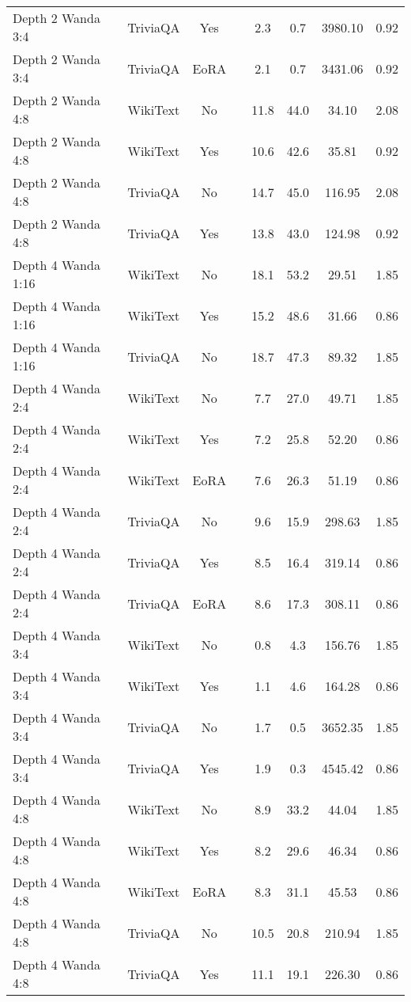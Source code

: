 \begin{longtable}{lcclcccc}
Depth 2 Wanda 3:4 & TriviaQA & Yes & & 2.3 & 0.7 & 3980.10 & 0.92 \\
Depth 2 Wanda 3:4 & TriviaQA & EoRA & & 2.1 & 0.7 & 3431.06 & 0.92 \\
Depth 2 Wanda 4:8 & WikiText & No & & 11.8 & 44.0 & 34.10 & 2.08 \\
Depth 2 Wanda 4:8 & WikiText & Yes & & 10.6 & 42.6 & 35.81 & 0.92 \\
Depth 2 Wanda 4:8 & TriviaQA & No & & 14.7 & 45.0 & 116.95 & 2.08 \\
Depth 2 Wanda 4:8 & TriviaQA & Yes & & 13.8 & 43.0 & 124.98 & 0.92 \\
Depth 4 Wanda 1:16 & WikiText & No & & 18.1 & 53.2 & 29.51 & 1.85 \\
Depth 4 Wanda 1:16 & WikiText & Yes & & 15.2 & 48.6 & 31.66 & 0.86 \\
Depth 4 Wanda 1:16 & TriviaQA & No & & 18.7 & 47.3 & 89.32 & 1.85 \\
Depth 4 Wanda 2:4 & WikiText & No & & 7.7 & 27.0 & 49.71 & 1.85 \\
Depth 4 Wanda 2:4 & WikiText & Yes & & 7.2 & 25.8 & 52.20 & 0.86 \\
Depth 4 Wanda 2:4 & WikiText & EoRA & & 7.6 & 26.3 & 51.19 & 0.86 \\
Depth 4 Wanda 2:4 & TriviaQA & No & & 9.6 & 15.9 & 298.63 & 1.85 \\
Depth 4 Wanda 2:4 & TriviaQA & Yes & & 8.5 & 16.4 & 319.14 & 0.86 \\
Depth 4 Wanda 2:4 & TriviaQA & EoRA & & 8.6 & 17.3 & 308.11 & 0.86 \\
Depth 4 Wanda 3:4 & WikiText & No & & 0.8 & 4.3 & 156.76 & 1.85 \\
Depth 4 Wanda 3:4 & WikiText & Yes & & 1.1 & 4.6 & 164.28 & 0.86 \\
Depth 4 Wanda 3:4 & TriviaQA & No & & 1.7 & 0.5 & 3652.35 & 1.85 \\
Depth 4 Wanda 3:4 & TriviaQA & Yes & & 1.9 & 0.3 & 4545.42 & 0.86 \\
Depth 4 Wanda 4:8 & WikiText & No & & 8.9 & 33.2 & 44.04 & 1.85 \\
Depth 4 Wanda 4:8 & WikiText & Yes & & 8.2 & 29.6 & 46.34 & 0.86 \\
Depth 4 Wanda 4:8 & WikiText & EoRA & & 8.3 & 31.1 & 45.53 & 0.86 \\
Depth 4 Wanda 4:8 & TriviaQA & No & & 10.5 & 20.8 & 210.94 & 1.85 \\
Depth 4 Wanda 4:8 & TriviaQA & Yes & & 11.1 & 19.1 & 226.30 & 0.86 \\

\end{longtable}
